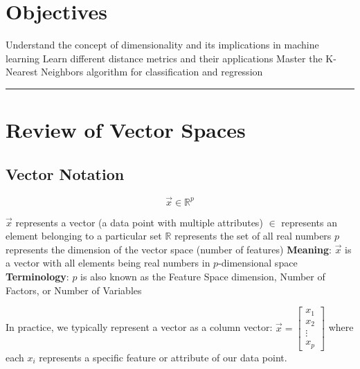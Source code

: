 

\section*{Objectives}
\begin{outline}
  \1 Understand the concept of dimensionality and its implications in machine learning
  \1 Learn different distance metrics and their applications
  \1 Master the K-Nearest Neighbors algorithm for classification and regression
\end{outline}

\rule[0.0051in]{\textwidth}{0.00025in}

\section{Review of Vector Spaces}
\subsection{Vector Notation}
\[
\vec{x} \in {\mathbb{R}}^p
\]

\begin{outline}
    \1 $\vec{x}$ represents a vector (a data point with multiple attributes) 
    \1 $\in$ represents an element belonging to a particular set 
    \1 $\mathbb{R}$ represents the set of all real numbers 
    \1 $p$ represents the dimension of the vector space (number of features) 
    \1 \textbf{Meaning}: $\vec{x}$ is a vector with all elements being real numbers in $p$-dimensional space
    \1 \textbf{Terminology}: $p$ is also known as the Feature Space dimension, Number of Factors, or Number of Variables
\end{outline}

In practice, we typically represent a vector as a column vector:
$\vec{x} = \begin{bmatrix}
x_1 \\
x_2 \\
\vdots \\
x_p
\end{bmatrix}$ 
where each $x_i$ represents a specific feature or attribute of our data point.

